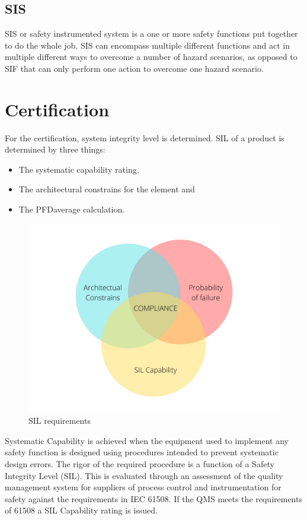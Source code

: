 \subsection{SIS}
\label{sec:sis}

SIS or safety instrumented system is a one or more safety functions put together to do the whole job. SIS can encompass multiple different functions and act in multiple different ways to overcome a number of hazard scenarios, as opposed to SIF that can only perform one action to overcome one hazard scenario.

\section{Certification}


For the certification, system integrity level is determined. SIL of a product is determined by three things\citep{func_safety_fundamentals}:
\begin{itemize}

    \item The systematic capability rating,
    \item The architectural constrains for the element and
    \item The PFDaverage calculation.
    
\end{itemize}

\begin{figure}[H]

      \centering
      \includegraphics[width=0.7\linewidth]{images/sil_requirements.png}
      \caption{SIL requirements}
      \label{fig:sil_requirements}
    
\end{figure}

Systematic Capability is achieved when the equipment used to implement any safety function is designed using procedures intended to prevent systematic design errors.  The rigor of the required procedure is a function of a Safety Integrity Level (SIL). This is evaluated through an assessment of the quality management system for suppliers of process control and instrumentation for safety against the requirements in IEC 61508.  If the QMS meets the requirements of 61508 a SIL Capability rating is issued. 

